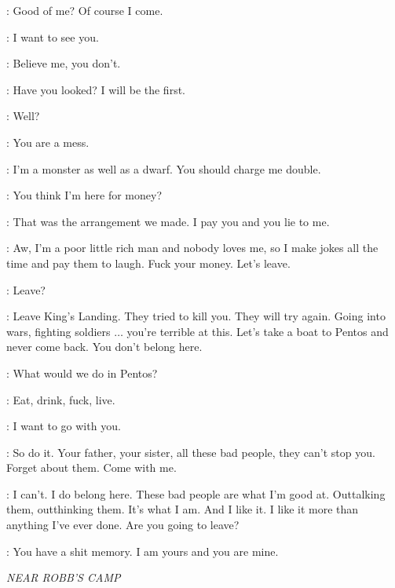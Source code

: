 \SHAE: Good of me? Of course I come. 


\SHAE: I want to see you. 

\TYRION: Believe me, you don't. 

\SHAE: Have you looked? I will be the first. 


\TYRION: Well? 

\SHAE:  You are a mess. 

\TYRION: I'm a monster as well as a dwarf. You should charge me double. 

\SHAE: You think I'm here for money? 

\TYRION: That was the arrangement we made. I pay you and you lie to me. 

\SHAE: Aw, I'm a poor little rich man and nobody loves me, so I make jokes all the time and pay them to laugh. Fuck your money. Let's leave. 

\TYRION: Leave? 

\SHAE: Leave King's Landing. They tried to kill you. They will try again. Going into wars, fighting soldiers $\ldots$ you're terrible at this. Let's take a boat to Pentos and never come back. You don't belong here. 

\TYRION: What would we do in Pentos? 

\SHAE: Eat, drink, fuck, live. 

\TYRION: I want to go with you. 

\SHAE: So do it.  Your father, your sister, all these bad people, they can't stop you. Forget about them. Come with me. 

\TYRION: I can't. I do belong here. These bad people are what I'm good at. Outtalking them, outthinking them. It's what I am. And I like it. I like it more than anything I've ever done. Are you going to leave? 

\SHAE: You have a shit memory. I am yours and you are mine. 



\scene

\textit{NEAR ROBB'S CAMP} 


